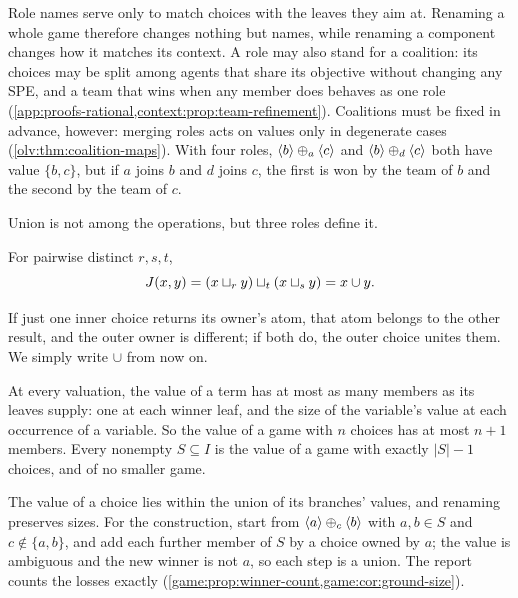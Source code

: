 Role names serve only to match choices with the leaves they aim at. Renaming a whole game therefore changes nothing but names, while renaming a component changes how it matches its context. A role may also stand for a coalition: its choices may be split among agents that share its objective without changing any SPE, and a team that wins when any member does behaves as one role (\cref{app:proofs-rational,context:prop:team-refinement}). Coalitions must be fixed in advance, however: merging roles acts on values only in degenerate cases (\cref{olv:thm:coalition-maps}). With four roles, $\langle b\rangle\mathbin{\oplus_{a}}\langle c\rangle$ and $\langle b\rangle\mathbin{\oplus_{d}}\langle c\rangle$ both have value $\{b,c\}$, but if $a$ joins $b$ and $d$ joins $c$, the first is won by the team of $b$ and the second by the team of $c$.

Union is not among the operations, but three roles define it.

\begin{proposition}\label{game:thm:union}
For pairwise distinct $r,s,t$,
\begin{equation}\label{game:eq:union}
 J(x,y)=(x\mathbin{\sqcup_{r}} y)\mathbin{\sqcup_{t}}(x\mathbin{\sqcup_{s}} y)=x\cup y.
\end{equation}
\end{proposition}

If just one inner choice returns its owner's atom, that atom belongs to the other result, and the outer owner is different; if both do, the outer choice unites them. We simply write $\cup$ from now on.

\begin{proposition}\label{game:prop:winner-budget}
At every valuation, the value of a term has at most as many members as its leaves supply: one at each winner leaf, and the size of the variable's value at each occurrence of a variable. So the value of a game with $n$ choices has at most $n+1$ members. Every nonempty $S\subseteq I$ is the value of a game with exactly $|S|-1$ choices, and of no smaller game.
\end{proposition}

\begin{idea}
The value of a choice lies within the union of its branches' values, and renaming preserves sizes. For the construction, start from $\langle a\rangle\mathbin{\oplus_{c}}\langle b\rangle$ with $a,b\in S$ and $c\notin\{a,b\}$, and add each further member of $S$ by a choice owned by $a$; the value is ambiguous and the new winner is not $a$, so each step is a union. The report counts the losses exactly (\cref{game:prop:winner-count,game:cor:ground-size}).
\end{idea}

